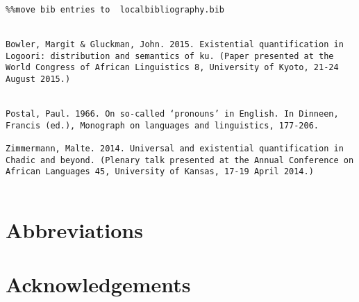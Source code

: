 \documentclass[output=paper]{langsci/langscibook}
\begin{document}
\begin{verbatim}%%move bib entries to  localbibliography.bib


Bowler, Margit & Gluckman, John. 2015. Existential quantification in Logoori: distribution and semantics of ku. (Paper presented at the World Congress of African Linguistics 8, University of Kyoto, 21-24 August 2015.)


Postal, Paul. 1966. On so-called ‘pronouns’ in English. In Dinneen, Francis (ed.), Monograph on languages and linguistics, 177-206.

Zimmermann, Malte. 2014. Universal and existential quantification in Chadic and beyond. (Plenary talk presented at the Annual Conference on African Languages 45, University of Kansas, 17-19 April 2014.)


\end{verbatim}

\section*{Abbreviations}
\section*{Acknowledgements}

\printbibliography[heading=subbibliography,notkeyword=this]
\end{document}

